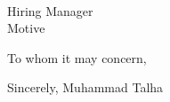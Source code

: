 \documentclass[10pt,letter]{letter}
\def\name{Muhammad Talha} %
\def\hm{} %
\def\company{Motive} %
\def \closing{Sincerely, \name}
\begin{document}
\begin{letter}{\hm \\ Hiring Manager \\ \company }

\opening{To whom it may concern,}




 

\closing{}
\end{letter}
\end{document}
